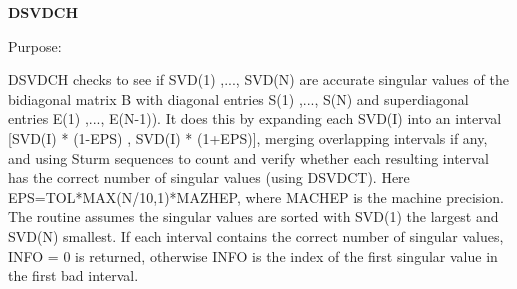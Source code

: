 {\bfseries D\+S\+V\+D\+C\+H} 

\begin{DoxyParagraph}{Purpose\+: }
\begin{DoxyVerb} DSVDCH checks to see if SVD(1) ,..., SVD(N) are accurate singular
 values of the bidiagonal matrix B with diagonal entries
 S(1) ,..., S(N) and superdiagonal entries E(1) ,..., E(N-1)).
 It does this by expanding each SVD(I) into an interval
 [SVD(I) * (1-EPS) , SVD(I) * (1+EPS)], merging overlapping intervals
 if any, and using Sturm sequences to count and verify whether each
 resulting interval has the correct number of singular values (using
 DSVDCT). Here EPS=TOL*MAX(N/10,1)*MAZHEP, where MACHEP is the
 machine precision. The routine assumes the singular values are sorted
 with SVD(1) the largest and SVD(N) smallest.  If each interval
 contains the correct number of singular values, INFO = 0 is returned,
 otherwise INFO is the index of the first singular value in the first
 bad interval.\end{DoxyVerb}
 
\end{DoxyParagraph}


